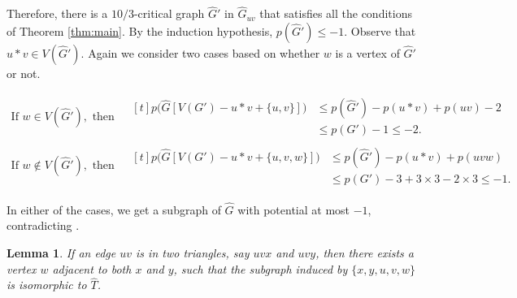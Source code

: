 \documentclass[11pt,a4paper]{article}
\makeatletter
\renewenvironment{proof}[1][\proofname]{\par
	\pushQED{\qed}%
	\normalfont \topsep6\p@\@plus6\p@\relax
	\trivlist
	\item[\hskip\labelsep
	\bfseries
	#1\@addpunct{.}]\ignorespaces
}{%
	\popQED\endtrivlist\@endpefalse
}
\newtheorem{lemma}[theorem]{Lemma}
\theoremstyle{definition}
\makeatother
\begin{document}
\begin{proof}
	
	Therefore, there is a $10/3$-critical graph $\widehat{G}'$  in $\widehat{G}_{uv}$ that satisfies all the conditions of Theorem \ref{thm:main}. By the induction hypothesis, $p(\widehat{G}')\leq -1$. Observe that $u*v\in V(\widehat{G}')$. Again we consider two cases based on whether $w$ is a vertex of $\widehat{G}'$ or not. 

\begin{align*}
\text{If } w \in V(\widehat{G}'), \text{ then } &
\begin{aligned}[t]
p\big(\widehat{G}[V(G')-u*v+\{u, v\}]\big) 
&\leq p(\widehat{G}') - p(u*v) + p(uv) - 2 \\ 
&\leq p(G') - 1 \leq -2.
\end{aligned} \\[1ex]
\text{If } w \notin V(\widehat{G}'), \text{ then } &
\begin{aligned}[t]
p\big(\widehat{G}[V(G')-u*v+\{u, v, w\}]\big) 
&\leq p(\widehat{G}') - p(u*v) + p(uvw) \\ 
&\leq p(G') - 3 + 3 \times 3 - 2 \times 3 \leq -1.
\end{aligned}
\end{align*}





	In either of the cases, we get a subgraph of $\widehat{G}$ with potential at most $-1$, contradicting .
\end{proof}

\begin{lemma}\label{lem:PairTriangles}
	If an edge $uv$ is in two triangles, say $uvx$ and $uvy$, then there exists a vertex $w$ adjacent to both $x$ and $y$, such that the subgraph induced by $\{x,y,u,v,w\}$ is isomorphic to $\widehat{T}$.
\end{lemma}
\end{document}
